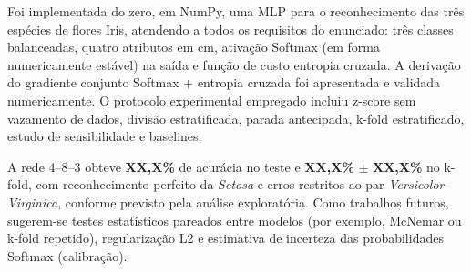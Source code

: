 \documentclass[12pt,a4paper]{article}
\newcommand{\XX}{\textbf{XX,X\%}}
\newcommand{\XN}{\textbf{XX}}
\newcommand{\AccTeste}{\XX}      \newcommand{\FUmTeste}{\XX}     \newcommand{\CETeste}{\XN}
\newcommand{\AccKfold}{\XX}      \newcommand{\DPKfold}{\XX}
\begin{document}
Foi implementada do zero, em NumPy, uma MLP para o reconhecimento das três espécies de flores Iris,
atendendo a todos os requisitos do enunciado: três classes balanceadas, quatro atributos em cm,
ativação Softmax (em forma numericamente estável) na saída e função de custo entropia cruzada. A
derivação do gradiente conjunto Softmax + entropia cruzada foi apresentada e validada numericamente.
O protocolo experimental empregado incluiu z-score sem vazamento de dados, divisão estratificada,
parada antecipada, k-fold estratificado, estudo de sensibilidade e baselines.

A rede 4--8--3 obteve \AccTeste{} de acurácia no teste e \AccKfold{} $\pm$ \DPKfold{} no k-fold, com
reconhecimento perfeito da \textit{Setosa} e erros restritos ao par \textit{Versicolor}--\textit{Virginica},
conforme previsto pela análise exploratória. Como trabalhos futuros, sugerem-se testes estatísticos
pareados entre modelos (por exemplo, McNemar ou k-fold repetido), regularização L2 e estimativa de
incerteza das probabilidades Softmax (calibração).

\end{document}
